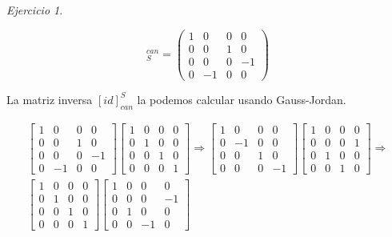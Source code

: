 \documentclass[11pt,a4paper]{article}
\theoremstyle{definition}
\theoremstyle{remark}
\newtheorem{exc}{Ejercicio}
\begin{document}
\begin{exc}
\begin{enumerate}
		\begin{equation}
		[id]_{S}^{can}= 
		\begin{pmatrix}
		1 & 0 & 0 & 0
		\\ 0 & 0 & 1 & 0  
		\\ 0 & 0 & 0 & -1
		\\ 0 & -1 & 0 & 0
		\end{pmatrix} \nonumber
		\end{equation}
		
		La matriz inversa $ [id]_{can}^{S} $ la podemos calcular usando Gauss-Jordan.
		
		\begin{multline}
		\begin{bmatrix}
		1 & 0 & 0 & 0
		\\ 0 & 0 & 1 & 0  
		\\ 0 & 0 & 0 & -1
		\\ 0 & -1 & 0 & 0
		\end{bmatrix}
		\begin{bmatrix}
		1 & 0 & 0 & 0
		\\ 0 & 1 & 0 & 0  
		\\ 0 & 0 & 1 & 0
		\\ 0 & 0 & 0 & 1
		\end{bmatrix}
		\nonumber \Rightarrow 
		\begin{bmatrix}
		1 & 0 & 0 & 0
		\\ 0 & -1 & 0 & 0
		\\ 0 & 0 & 1 & 0  
		\\ 0 & 0 & 0 & -1
		\end{bmatrix}
		\begin{bmatrix}
		1 & 0 & 0 & 0
		\\ 0 & 0 & 0 & 1
		\\ 0 & 1 & 0 & 0  
		\\ 0 & 0 & 1 & 0
		\end{bmatrix} \Rightarrow
		\\ 
		\begin{bmatrix}
		1 & 0 & 0 & 0
		\\ 0 & 1 & 0 & 0
		\\ 0 & 0 & 1 & 0  
		\\ 0 & 0 & 0 & 1
		\end{bmatrix}
		\begin{bmatrix}
		1 & 0 & 0 & 0
		\\ 0 & 0 & 0 & -1
		\\ 0 & 1 & 0 & 0  
		\\ 0 & 0 & -1 & 0
		\end{bmatrix}
		\end{multline}
		

\end{enumerate}
\end{exc}
\end{document}
